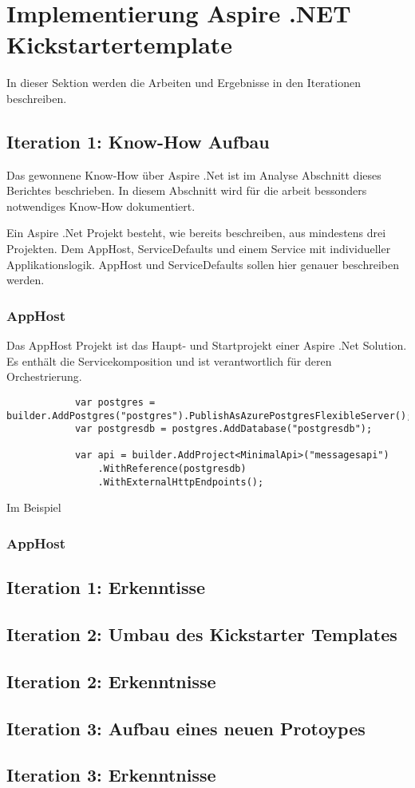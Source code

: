 \section{Implementierung Aspire .NET Kickstartertemplate}
    In dieser Sektion werden die Arbeiten und Ergebnisse in den Iterationen beschreiben.

    \subsection{Iteration 1: Know-How Aufbau}
        Das gewonnene Know-How über Aspire .Net ist im Analyse Abschnitt dieses Berichtes beschrieben. In diesem Abschnitt wird für die arbeit bessonders notwendiges Know-How dokumentiert.

        Ein Aspire .Net Projekt besteht, wie bereits beschreiben, aus mindestens drei Projekten. Dem AppHost, ServiceDefaults und einem Service mit individueller Applikationslogik. AppHost und ServiceDefaults sollen hier genauer beschreiben werden.

        \subsubsection{AppHost}
            Das AppHost Projekt ist das Haupt- und Startprojekt einer Aspire .Net Solution. Es enthält die Servicekomposition und ist verantwortlich für deren Orchestrierung.
            \begin{verbatim}
            var postgres = builder.AddPostgres("postgres").PublishAsAzurePostgresFlexibleServer();
            var postgresdb = postgres.AddDatabase("postgresdb");

            var api = builder.AddProject<MinimalApi>("messagesapi")
                .WithReference(postgresdb)
                .WithExternalHttpEndpoints();
            \end{verbatim}
            Im Beispiel

    \subsubsection{AppHost}


    \subsection{Iteration 1: Erkenntisse}

    \subsection{Iteration 2: Umbau des Kickstarter Templates}

    \subsection{Iteration 2: Erkenntnisse}

    \subsection{Iteration 3: Aufbau eines neuen Protoypes}

    \subsection{Iteration 3: Erkenntnisse}



